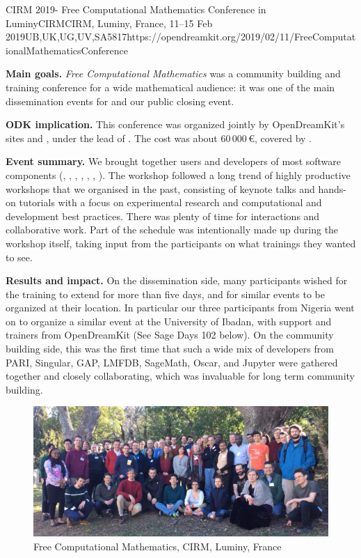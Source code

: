\begin{event}{CIRM 2019- Free Computational Mathematics Conference in Luminy}{CIRM}{CIRM, Luminy, France, 11--15 Feb 2019}{UB,UK,UG,UV,SA}{58}{17}{https://opendreamkit.org/2019/02/11/FreeComputationalMathematicsConference}

\textbf{Main goals.} \emph{Free Computational Mathematics} was
a community building and training conference for a wide mathematical audience:
it was one of the main dissemination events for \ODK and our public closing event.

\textbf{ODK implication.} This conference was organized jointly by
OpenDreamKit's sites  and , under the lead of .
The cost was about 60\,000\,\euro, covered by .

\textbf{Event summary.}
We brought together users and developers of most \ODK software components
(\GAP, \Jupyter, \Linbox, \MPIR, \PariGP, \Sage, \Singular).
The workshop followed a long trend of highly productive workshops that we organised in the past,
consisting of keynote talks and hands-on tutorials with a focus on experimental research
and computational and development best practices.
There was plenty of time for interactions and collaborative work.
Part of the schedule was intentionally made up during the workshop itself,
taking input from the participants on what trainings they wanted to see.


\textbf{Results and impact.} On the dissemination side, many
participants wished for the training to extend for more than five
days, and for similar events to be organized at their location. In
particular our three participants from Nigeria went on to organize a
similar event at the University of Ibadan, with support and trainers
from OpenDreamKit (See Sage Days 102 below). On the community building
side, this was the first time that such a wide mix of developers from
PARI, Singular, GAP, LMFDB, SageMath, Oscar, and Jupyter were gathered
together and closely collaborating, which was invaluable for long term
community building.

\begin{figure}[ht]
  \includegraphics[width=.75\textwidth]{CIRM.jpg}
  \caption*{Free Computational Mathematics, CIRM, Luminy, France}
\end{figure}

\end{event}
